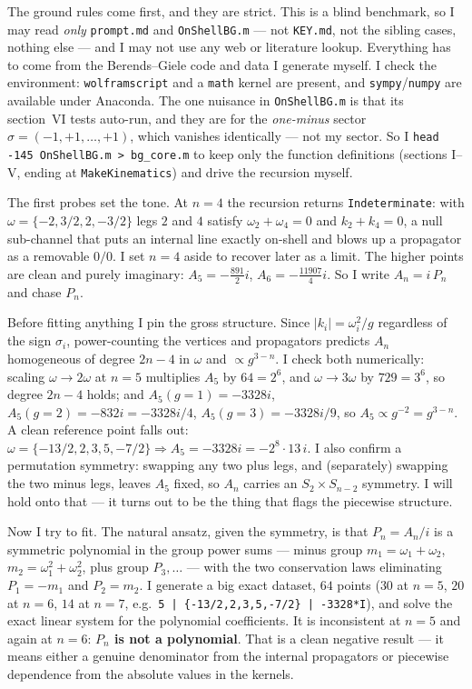 \documentclass{article}
\begin{document}
The ground rules come first, and they are strict. This is a blind benchmark, so I
may read \emph{only} \texttt{prompt.md} and \texttt{OnShellBG.m} --- not
\texttt{KEY.md}, not the sibling cases, nothing else --- and I may not use any
web or literature lookup. Everything has to come from the Berends--Giele code and
data I generate myself. I check the environment: \texttt{wolframscript} and a
\texttt{math} kernel are present, and \texttt{sympy}/\texttt{numpy} are available
under Anaconda. The one nuisance in \texttt{OnShellBG.m} is that its section~VI
tests auto-run, and they are for the \emph{one-minus} sector
$\sigma=(-1,+1,\dots,+1)$, which vanishes identically --- not my sector. So I
\texttt{head -145 OnShellBG.m > bg\_core.m} to keep only the function definitions
(sections I--V, ending at \texttt{MakeKinematics}) and drive the recursion myself.

The first probes set the tone. At $n=4$ the recursion returns
\texttt{Indeterminate}: with $\omega=\{-2,3/2,2,-3/2\}$ legs $2$ and $4$ satisfy
$\omega_2+\omega_4=0$ and $k_2+k_4=0$, a null sub-channel that puts an internal
line exactly on-shell and blows up a propagator as a removable $0/0$. I set $n=4$
aside to recover later as a limit. The higher points are clean and purely
imaginary: $A_5=-\tfrac{891}{2}i$, $A_6=-\tfrac{11907}{4}i$. So I write
$A_n=i\,P_n$ and chase $P_n$.

Before fitting anything I pin the gross structure. Since $|k_i|=\omega_i^2/g$
regardless of the sign $\sigma_i$, power-counting the vertices and propagators
predicts $A_n$ homogeneous of degree $2n-4$ in $\omega$ and $\propto g^{3-n}$. I
check both numerically: scaling $\omega\to2\omega$ at $n=5$ multiplies $A_5$ by
$64=2^6$, and $\omega\to3\omega$ by $729=3^6$, so degree $2n-4$ holds; and
$A_5(g{=}1)=-3328i$, $A_5(g{=}2)=-832i=-3328i/4$, $A_5(g{=}3)=-3328i/9$, so
$A_5\propto g^{-2}=g^{3-n}$. A clean reference point falls out:
$\omega=\{-13/2,2,3,5,-7/2\}\Rightarrow A_5=-3328i=-2^8\cdot13\,i$. I also confirm
a permutation symmetry: swapping any two plus legs, and (separately) swapping the
two minus legs, leaves $A_5$ fixed, so $A_n$ carries an $S_2\times S_{n-2}$
symmetry. I will hold onto that --- it turns out to be the thing that flags the
piecewise structure.

Now I try to fit. The natural ansatz, given the symmetry, is that
$P_n=A_n/i$ is a symmetric polynomial in the group power sums --- minus group
$m_1=\omega_1+\omega_2$, $m_2=\omega_1^2+\omega_2^2$, plus group
$P_3,\dots$ --- with the two conservation laws eliminating $P_1=-m_1$ and
$P_2=m_2$. I generate a big exact dataset, $64$ points ($30$ at $n=5$, $20$ at
$n=6$, $14$ at $n=7$, e.g.\ \texttt{5 | \{-13/2,2,3,5,-7/2\} | -3328*I}), and
solve the exact linear system for the polynomial coefficients. It is inconsistent
at $n=5$ and again at $n=6$: \textbf{$P_n$ is not a polynomial}. That is a clean
negative result --- it means either a genuine denominator from the internal
propagators or piecewise dependence from the absolute values in the kernels.
\end{document}
